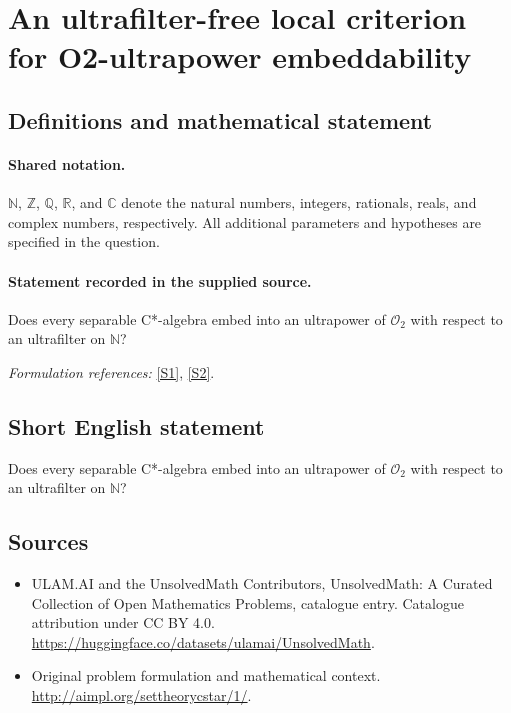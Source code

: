 \documentclass[11pt]{article}
\newcommand{\sref}[2]{\hyperlink{source:#1:#2}{[S#2]}}
\begin{document}
\section{An ultrafilter-free local criterion for O2-ultrapower embeddability}\label{statement}

\subsection{Definitions and mathematical statement}

\paragraph{Shared notation.}$\mathbb N$, $\mathbb Z$, $\mathbb Q$, $\mathbb R$, and $\mathbb C$ denote the natural numbers, integers, rationals, reals, and complex numbers, respectively. All additional parameters and hypotheses are specified in the question.


\paragraph{Statement recorded in the supplied source.}
Does every separable C*-algebra embed into an ultrapower of
$\mathcal O_2$ with respect to an ultrafilter on $\mathbb N$?
\par\smallskip\textit{Formulation references:} \sref{statement}{1}, \sref{statement}{2}.
\subsection{Short English statement}
Does every separable C*-algebra embed into an ultrapower of
$\mathcal O_2$ with respect to an ultrafilter on $\mathbb N$?
\subsection{Sources}
\begin{itemize}
\item[\hypertarget{source:statement:1}{S1}] ULAM.AI and the UnsolvedMath Contributors, UnsolvedMath: A Curated Collection of Open Mathematics Problems, catalogue entry. Catalogue attribution under CC BY 4.0.
\url{https://huggingface.co/datasets/ulamai/UnsolvedMath}.
\item[\hypertarget{source:statement:2}{S2}] Original problem formulation and mathematical context.
\url{http://aimpl.org/settheorycstar/1/}.
\end{itemize}
\label{end:statement}
\end{document}
